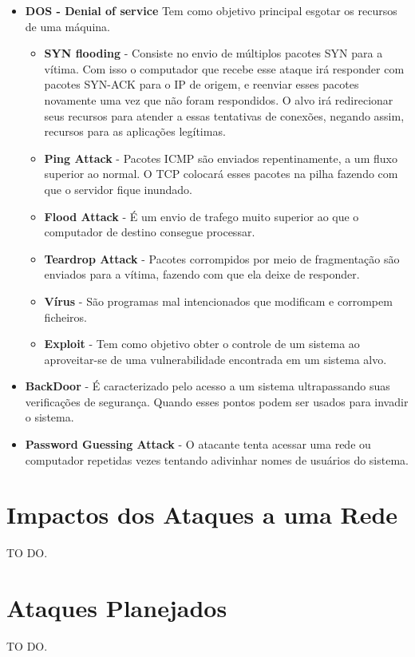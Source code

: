 		\begin{itemize}
			\item  \textbf{DOS - Denial of service} Tem  como objetivo principal esgotar os recursos de uma máquina.
				\begin{itemize}
					\item \textbf{SYN flooding} - Consiste no envio de múltiplos pacotes SYN para a vítima. Com isso o computador que recebe esse ataque irá responder com pacotes SYN-ACK para o IP de origem, e reenviar esses pacotes novamente uma vez que não foram respondidos. O alvo irá redirecionar seus recursos para atender a essas tentativas de conexões, negando assim, recursos para as aplicações legítimas.  
					\item \textbf{Ping Attack} - Pacotes ICMP são enviados repentinamente, a um fluxo superior ao normal. O TCP colocará esses pacotes na pilha fazendo com que o servidor fique inundado.
					\item \textbf{Flood Attack} - É um envio de trafego muito superior ao que o computador de destino consegue processar.
					\item \textbf{Teardrop Attack} - Pacotes corrompidos por meio de fragmentação são enviados para a vítima, fazendo com que ela deixe de responder.
					\item \textbf{Vírus} - São programas mal intencionados que modificam e corrompem ficheiros.
					\item \textbf{Exploit} - Tem como objetivo obter o controle de um sistema ao aproveitar-se de uma vulnerabilidade encontrada em um sistema alvo.
				\end{itemize}

			\item \textbf{BackDoor} - É caracterizado pelo acesso a um sistema ultrapassando suas verificações de segurança. Quando esses pontos podem ser usados para invadir o sistema.
			\item \textbf{Password Guessing Attack} - O atacante tenta acessar uma rede ou computador repetidas vezes tentando adivinhar nomes de usuários do sistema.
		\end{itemize}


	\section{Impactos dos Ataques a uma Rede}
	\label{sec:Seguranca_Impactos}

		TO DO.

	\section{Ataques Planejados}
	\label{sec:Seguranca_Planejamento}

		TO DO.

